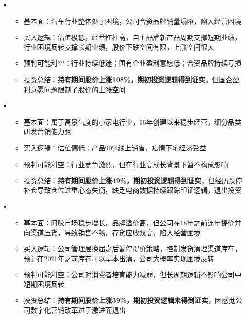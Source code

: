   \begin{itemize}[leftmargin=*]
    \item
      {\small
      \begin{itemize}
        \item 基本面：汽车行业整体处于困境，公司合资品牌销量塌陷，陷入经营困境
        \item 买入逻辑：估值极低，经营杠杆高，自主品牌新产品周期支撑短期业绩，行业困境反转支撑长期业绩，股价下跌空间有限，上涨空间很大
        \item 预判可能利空：行业持续低迷；国有企业盈利意愿低；合资品牌持续亏损
        \item 投资总结：\textbf{持有期间股价上涨108\%，期初投资逻辑得到证实}，但国企盈利意愿问题限制了股价的上涨空间
      \end{itemize}
      }
    \item
      {\small
      \begin{itemize}
        \item 基本面：属于高景气度的小家电行业，06年创建以来稳步经营，细分品类研发营销能力强
        \item 买入逻辑：估值偏低；产品90\%线上销售，疫情下宅经济受益
        \item 预判可能利空：行业竞争激烈，但在行业高成长背景下暂不构成影响
        \item 投资总结：\textbf{持有期间股价上涨49\%，期初投资逻辑得到证实}，但经历跌停补仓导致仓位过重心态失衡，缺乏电商数据持续跟踪印证逻辑，退出投资
      \end{itemize}
      }
    \item
      {\small
      \begin{itemize}
        \item 基本面：阿胶市场稳步增长，品牌溢价高，但公司在18年之前连年提价并向渠道压货，导致销售不畅，存货应收双高，陷入经营困境
        \item 买入逻辑：公司管理层换届之后暂停提价策略，控制发货清理渠道库存，预计在2021年之前库存可以基本出清，公司大概率实现困境反转
        \item 预判可能利空：公司对消费者培育能力减弱，但长周期逻辑不影响公司中短期困境反转
        \item 投资总结：\textbf{持有期间股价上涨39\%，期初投资逻辑未得到证实}，因感觉公司数字化营销改革过于激进而退出
      \end{itemize}
}
\end{itemize}
